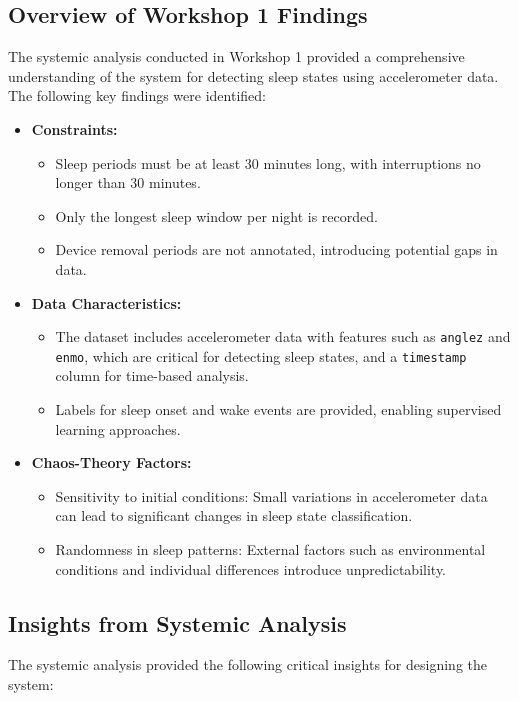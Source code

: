 \documentclass[conference]{IEEEtran}
\begin{document}
\subsection{Overview of Workshop 1 Findings}
The systemic analysis conducted in Workshop 1 provided a comprehensive understanding of the system for detecting sleep states using accelerometer data. The following key findings were identified:

\begin{itemize}
	\item \textbf{Constraints:}
	      \begin{itemize}
		      \item Sleep periods must be at least 30 minutes long, with interruptions no longer than 30 minutes.
		      \item Only the longest sleep window per night is recorded.
		      \item Device removal periods are not annotated, introducing potential gaps in data.
	      \end{itemize}
	\item \textbf{Data Characteristics:}
	      \begin{itemize}
		      \item The dataset includes accelerometer data with features such as \texttt{anglez} and \texttt{enmo}, which are critical for detecting sleep states, and a \texttt{timestamp} column for time-based analysis.
		      \item Labels for sleep onset and wake events are provided, enabling supervised learning approaches.
	      \end{itemize}
	\item \textbf{Chaos-Theory Factors:}
	      \begin{itemize}
		      \item Sensitivity to initial conditions: Small variations in accelerometer data can lead to significant changes in sleep state classification.
		      \item Randomness in sleep patterns: External factors such as environmental conditions and individual differences introduce unpredictability.
	      \end{itemize}
\end{itemize}

\subsection{Insights from Systemic Analysis}
The systemic analysis provided the following critical insights for designing the system:
\end{document}
